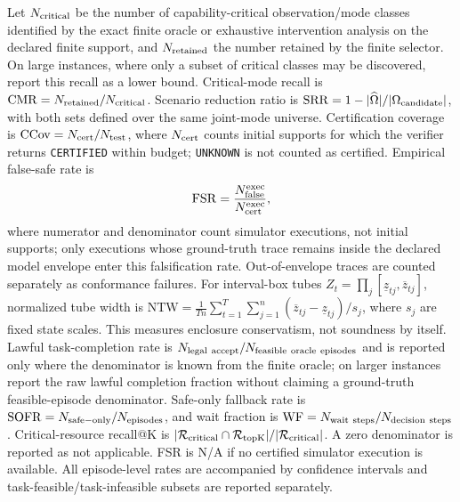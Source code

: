 \documentclass[letterpaper]{article} %
\begin{document}
Let $N_{\rm critical}$ be the number of capability-critical observation/mode classes identified by the exact finite oracle or exhaustive intervention analysis on the declared finite support, and $N_{\rm retained}$ the number retained by the finite selector. On large instances, where only a subset of critical classes may be discovered, report this recall as a lower bound. Critical-mode recall is $\mathrm{CMR}=N_{\rm retained}/N_{\rm critical}$. Scenario reduction ratio is $\mathrm{SRR}=1-|\widehat\Omega|/|\Omega_{\rm candidate}|$, with both sets defined over the same joint-mode universe. Certification coverage is $\mathrm{CCov}=N_{\rm cert}/N_{\rm test}$, where $N_{\rm cert}$ counts initial supports for which the verifier returns \texttt{CERTIFIED} within budget; \texttt{UNKNOWN} is not counted as certified. Empirical false-safe rate is
\begin{equation}
\mathrm{FSR}=\frac{N_{\rm false}^{\rm exec}}{N_{\rm cert}^{\rm exec}},
\label{eq:fsr}
\end{equation}
where numerator and denominator count simulator executions, not initial supports; only executions whose ground-truth trace remains inside the declared model envelope enter this falsification rate. Out-of-envelope traces are counted separately as conformance failures. For interval-box tubes $Z_t=\prod_j[\underline z_{tj},\overline z_{tj}]$, normalized tube width is $\mathrm{NTW}=\frac{1}{Tn}\sum_{t=1}^{T}\sum_{j=1}^{n}(\overline z_{tj}-\underline z_{tj})/s_j$, where $s_j$ are fixed state scales. This measures enclosure conservatism, not soundness by itself. Lawful task-completion rate is $N_{\rm legal\ accept}/N_{\rm feasible\ oracle\ episodes}$ and is reported only where the denominator is known from the finite oracle; on larger instances report the raw lawful completion fraction without claiming a ground-truth feasible-episode denominator. Safe-only fallback rate is $\mathrm{SOFR}=N_{\rm safe-only}/N_{\rm episodes}$, and wait fraction is $\mathrm{WF}=N_{\rm wait\ steps}/N_{\rm decision\ steps}$. Critical-resource recall@K is $|\mathcal R_{\rm critical}\cap\mathcal R_{\rm topK}|/|\mathcal R_{\rm critical}|$. A zero denominator is reported as not applicable. FSR is N/A if no certified simulator execution is available. All episode-level rates are accompanied by confidence intervals and task-feasible/task-infeasible subsets are reported separately.
\end{document}
